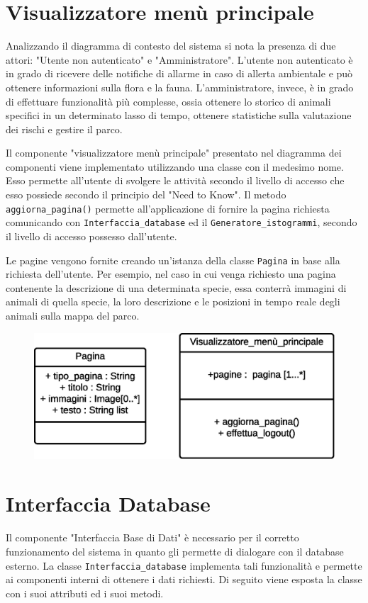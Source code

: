 \section{Visualizzatore menù principale}
Analizzando il diagramma di contesto del sistema si nota la presenza di due attori: "Utente non autenticato" e "Amministratore". L'utente non autenticato è in grado di ricevere delle notifiche di allarme in caso di allerta ambientale e può ottenere informazioni sulla flora e la fauna. L'amministratore, invece, è in grado di effettuare funzionalità più complesse, ossia ottenere lo storico di animali specifici in un determinato lasso di tempo, ottenere statistiche sulla valutazione dei rischi e gestire il parco. 

Il componente "visualizzatore menù principale" presentato nel diagramma dei componenti viene implementato utilizzando una classe con il medesimo nome. Esso permette all'utente di svolgere le attività secondo il livello di accesso che esso possiede secondo il principio del "Need to Know". Il metodo \texttt{aggiorna\_pagina()} permette all'applicazione di fornire la pagina richiesta comunicando con \texttt{Interfaccia\_database} ed il \texttt{Generatore\_istogrammi}, secondo il livello di accesso possesso dall'utente.

Le pagine vengono fornite creando un'istanza della classe \texttt{Pagina} in base alla richiesta dell'utente. Per esempio, nel caso in cui venga richiesto una pagina contenente la descrizione di una determinata specie, essa conterrà immagini di animali di quella specie, la loro descrizione e le posizioni in tempo reale degli animali sulla mappa del parco.

\begin{figure}[ht]
    \centering
    \includegraphics[scale=0.4]{Img/ClassMenu.eps}
\end{figure}

\newpage
\section{Interfaccia Database}
Il componente "Interfaccia Base di Dati" è necessario per il corretto funzionamento del sistema in quanto gli permette di dialogare con il database esterno. La classe \texttt{Interfaccia\_database} implementa tali funzionalità e permette ai componenti interni di ottenere i dati richiesti. Di seguito viene esposta la classe con i suoi attributi ed i suoi metodi. 

